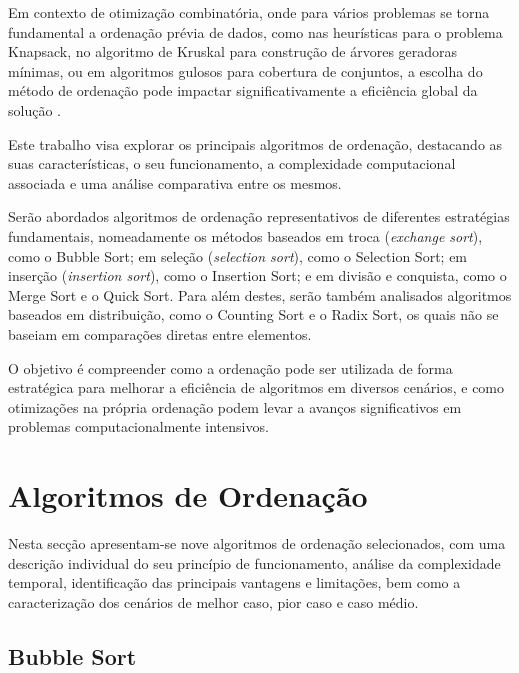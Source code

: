 \documentclass[conference]{IEEEtran}
\begin{document}
Em contexto de otimização combinatória, onde para vários problemas se torna fundamental a ordenação prévia de dados, como nas heurísticas para o problema Knapsack, no algoritmo de Kruskal para construção de árvores geradoras mínimas, ou em algoritmos gulosos para cobertura de conjuntos, a escolha do método de ordenação pode impactar significativamente a eficiência global da solução \cite{deng2025combinatorial}.

Este trabalho visa explorar os principais algoritmos de ordenação, destacando as suas características, o seu funcionamento, a complexidade computacional associada e uma análise comparativa entre os mesmos.

Serão abordados algoritmos de ordenação representativos de diferentes estratégias fundamentais, nomeadamente os métodos baseados em troca (\textit{exchange sort}), como o Bubble Sort; em seleção (\textit{selection sort}), como o Selection Sort; em inserção (\textit{insertion sort}), como o Insertion Sort; e em divisão e conquista, como o Merge Sort e o Quick Sort. Para além destes, serão também analisados algoritmos baseados em distribuição, como o Counting Sort e o Radix Sort, os quais não se baseiam em comparações diretas entre elementos.

O objetivo é compreender como a ordenação pode ser utilizada de forma estratégica para melhorar a eficiência de algoritmos em diversos cenários, e como otimizações na própria ordenação podem levar a avanços significativos em problemas computacionalmente intensivos.

\section{Algoritmos de Ordenação}

Nesta secção apresentam-se nove algoritmos de ordenação selecionados, com uma descrição individual do seu princípio de funcionamento, análise da complexidade temporal, identificação das principais vantagens e limitações, bem como a caracterização dos cenários de melhor caso, pior caso e caso médio.

\subsection{Bubble Sort}

\end{document}
